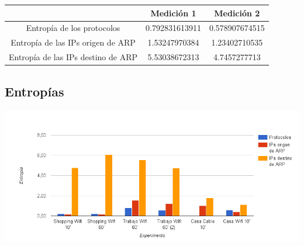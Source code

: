 \begin{center}
\begin{tabular}{|c||c|c|}
\hline
 & Medición 1 & Medición 2 \\
\hline
\hline
Entropía de los protocolos & 0.792831613911 & 0.578907674515 \\
\hline
Entropía de las IPs origen de ARP & 1.53247970384 & 1.23402710535 \\
\hline
Entropía de las IPs destino de ARP & 5.53038672313 & 4.7457277713 \\
\hline
\end{tabular}
\end{center}

\subsection{Entropías}

\begin{center}
\includegraphics[width=14cm]{../mediciones/entropias.png}
\end{center}
